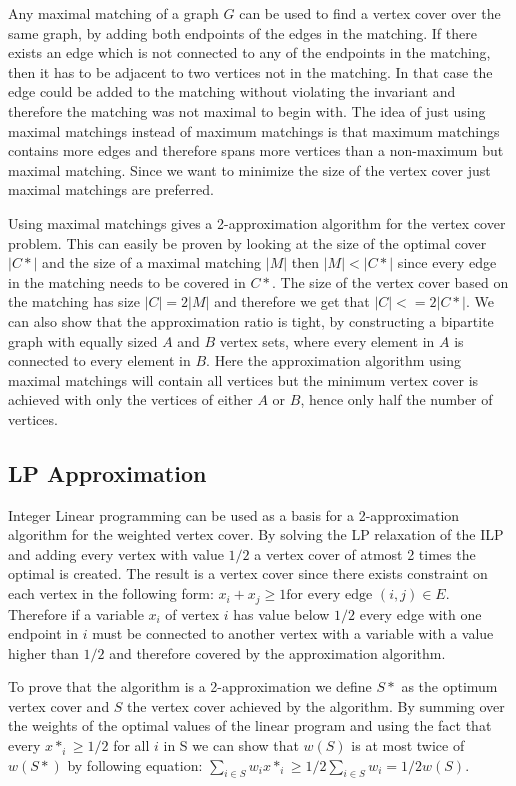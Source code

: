 Any maximal matching of a graph $G$ can be used to find a vertex cover over the same graph, by adding both endpoints of the edges in the matching. If there exists an edge which is not connected to any of the endpoints in the matching, then it has to be adjacent to two vertices not in the matching. In that case the edge could be added to the matching without violating the invariant and therefore the matching was not maximal to begin with. The idea of just using maximal matchings instead of maximum matchings is that maximum matchings contains more edges and therefore spans more vertices than a non-maximum but maximal matching. Since we want to minimize the size of the vertex cover just maximal matchings are preferred.

Using maximal matchings gives a 2-approximation algorithm for the vertex cover problem. This can easily be proven by looking at the size of the optimal cover $|C*|$ and the size of a maximal matching $|M|$ then $|M| < |C*|$ since every edge in the matching needs to be covered in $C*$. The size of the vertex cover based on the matching has size $|C|=2|M|$ and therefore we get that $|C| <= 2|C*|$. We can also show that the approximation ratio is tight, by constructing a bipartite graph with equally sized $A$ and $B$ vertex sets, where every element in $A$ is connected to every element in $B$. Here the approximation algorithm using maximal matchings will contain all vertices but the minimum vertex cover is achieved with only the vertices of either $A$ or $B$, hence only half the number of vertices.

\subsection{LP Approximation}
Integer Linear programming can be used as a basis for a 2-approximation algorithm for the weighted vertex cover. By solving the LP relaxation of the ILP and adding every vertex with value $1/2$ a vertex cover of atmost 2 times the optimal is created. The result is a vertex cover since there exists constraint on each vertex in the following form: $x_i + x_j \ge 1 \text{for every edge } (i,j) \in E$. Therefore if a variable $x_i$ of vertex $i$ has value below $1/2$ every edge with one endpoint in $i$ must be connected to another vertex with a variable with a value higher than $1/2$ and therefore covered by the approximation algorithm.

To prove that the algorithm is a 2-approximation we define $S*$ as the optimum vertex cover and $S$ the vertex cover achieved by the algorithm. By summing over the weights of the optimal values of the linear program and using the fact that every $x*_i \ge 1/2$ for all $i$ in S we can show that $w(S)$ is at most twice of $w(S*)$ by following equation: $\sum_{i \in S} w_i x*_i \ge 1/2 \sum_{i \in S} w_i = 1/2 w(S)$.

